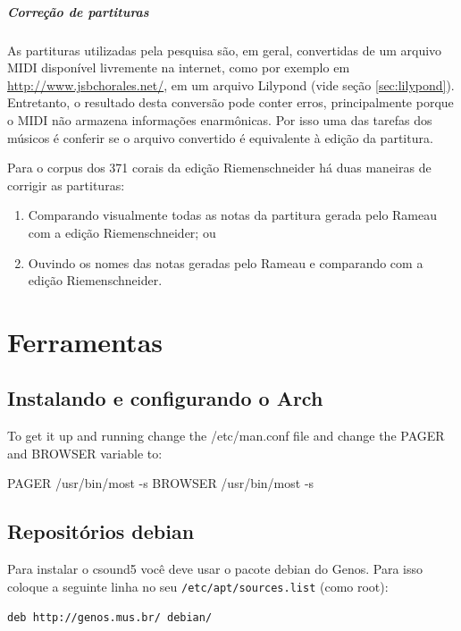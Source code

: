 \documentclass[12pt,brazil]{book}
\begin{document}
\subsubsection{Correção de partituras}
\label{sec:corr-de-part}

As partituras utilizadas pela pesquisa são, em geral, convertidas de
um arquivo MIDI disponível livremente na internet, como por exemplo em
\url{http://www.jsbchorales.net/}, em um arquivo Lilypond (vide seção
\ref{sec:lilypond}). Entretanto, o resultado desta conversão pode
conter erros, principalmente porque o MIDI não armazena informações
enarmônicas. Por isso uma das tarefas dos músicos é conferir se o
arquivo convertido é equivalente à edição da partitura.

Para o corpus dos 371 corais da edição Riemenschneider há duas
maneiras de corrigir as partituras:
\begin{enumerate}
\item Comparando visualmente todas as notas da partitura gerada pelo
  Rameau com a edição Riemenschneider; ou
\item Ouvindo os nomes das notas geradas pelo Rameau e comparando com
  a edição Riemenschneider.
\end{enumerate}

\part{Ferramentas}
\label{part:ferramentas}

\chapter{Instalando e configurando o Arch}
\label{cha:inst-e-conf}

To get it up and running change the /etc/man.conf file and change the PAGER and BROWSER variable to:

PAGER           /usr/bin/most -s
BROWSER         /usr/bin/most -s

\chapter{Repositórios debian}
\label{cha:repositorios-debian}

Para instalar o csound5 você deve usar o pacote debian do Genos. Para
isso coloque a seguinte linha no seu \texttt{/etc/apt/sources.list}
(como root):

\begin{verbatim}
deb http://genos.mus.br/ debian/
\end{verbatim}
\end{document}
